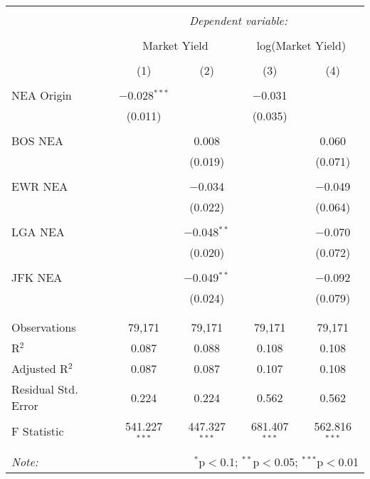 
\begin{tabular}{@{\extracolsep{5pt}}lcccc} 
\\[-1.8ex]\hline 
\hline \\[-1.8ex] 
 & \multicolumn{4}{c}{\textit{Dependent variable:}} \\ 
\cline{2-5} 
\\[-1.8ex] & \multicolumn{2}{c}{Market Yield} & \multicolumn{2}{c}{log(Market Yield)} \\ 
\\[-1.8ex] & (1) & (2) & (3) & (4)\\ 
\hline \\[-1.8ex] 
 NEA Origin & $-$0.028$^{***}$ &  & $-$0.031 &  \\ 
  & (0.011) &  & (0.035) &  \\ 
  & & & & \\ 
 BOS NEA &  & 0.008 &  & 0.060 \\ 
  &  & (0.019) &  & (0.071) \\ 
  & & & & \\ 
 EWR NEA &  & $-$0.034 &  & $-$0.049 \\ 
  &  & (0.022) &  & (0.064) \\ 
  & & & & \\ 
 LGA NEA &  & $-$0.048$^{**}$ &  & $-$0.070 \\ 
  &  & (0.020) &  & (0.072) \\ 
  & & & & \\ 
 JFK NEA &  & $-$0.049$^{**}$ &  & $-$0.092 \\ 
  &  & (0.024) &  & (0.079) \\ 
  & & & & \\ 
\hline \\[-1.8ex] 
Observations & 79,171 & 79,171 & 79,171 & 79,171 \\ 
R$^{2}$ & 0.087 & 0.088 & 0.108 & 0.108 \\ 
Adjusted R$^{2}$ & 0.087 & 0.087 & 0.107 & 0.108 \\ 
Residual Std. Error & 0.224 & 0.224 & 0.562 & 0.562 \\ 
F Statistic & 541.227$^{***}$ & 447.327$^{***}$ & 681.407$^{***}$ & 562.816$^{***}$ \\ 
\hline 
\hline \\[-1.8ex] 
\textit{Note:}  & \multicolumn{4}{r}{$^{*}$p$<$0.1; $^{**}$p$<$0.05; $^{***}$p$<$0.01} \\ 
\end{tabular} 

